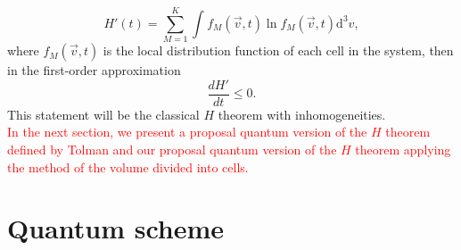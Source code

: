 \documentclass{article}
\begin{document}
\begin{equation}
   H'(t)=\sum_{M=1}^{K}\int_{}^{} f_M(\vec{v},t) \ln f_M(\vec{v},t)\mathrm{d}^3v  \label{CH3},
\end{equation}
where $f_M(\vec{v},t)$ is the local distribution function of each cell in the system, then in the first-order approximation
\begin{equation}
    \frac{dH'}{dt} \leq 0.
\end{equation}
This statement will be the classical $H$ theorem with inhomogeneities.\\
\textcolor{red}{In the next section, we present a proposal quantum version of the $H$ theorem defined by Tolman and our proposal quantum version of the $H$ theorem applying the method of the volume divided into cells.}


\section{Quantum scheme}
\end{document}
